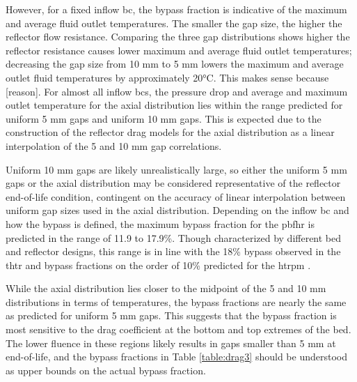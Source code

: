 However, for a fixed inflow \gls{bc}, the bypass fraction is indicative of the maximum and average fluid outlet temperatures. The smaller the gap size, the higher the reflector flow resistance. Comparing the three gap distributions shows higher the reflector resistance causes lower maximum and average fluid outlet temperatures; decreasing the gap size from 10 \si{\milli\meter} to 5 \si{\milli\meter} lowers the maximum and average outlet fluid temperatures by approximately 20\si{\celsius}. This makes sense because [reason]. For almost all inflow \glspl{bc}, the pressure drop and average and maximum outlet temperature for the axial distribution lies within the range predicted for uniform 5 \si{\milli\meter} gaps and uniform 10 \si{\milli\meter} gaps. This is expected due to the construction of the reflector drag models for the axial distribution as a linear interpolation of the 5 and 10 \si{\milli\meter} gap correlations. 

Uniform 10 \si{\milli\meter} gaps are likely unrealistically large, so either the uniform 5 \si{\milli\meter} gaps or the axial distribution may be considered representative of the reflector end-of-life condition, contingent on the accuracy of linear interpolation between uniform gap sizes used in the axial distribution. Depending on the inflow \gls{bc} and how the bypass is defined, the maximum bypass fraction for the \gls{pbfhr} is predicted in the range of 11.9 to 17.9\%. Though characterized by different bed and reflector designs, this range is in line with the 18\% bypass observed in the \gls{thtr} \cite{baumer} and bypass fractions on the order of 10\% predicted for the \gls{htrpm} \cite{jun,jun2011}.

While the axial distribution lies closer to the midpoint of the 5 and 10 \si{\milli\meter} distributions in terms of temperatures, the bypass fractions are nearly the same as predicted for uniform 5 \si{\milli\meter} gaps. This suggests that the bypass fraction is most sensitive to the drag coefficient at the bottom and top extremes of the bed. The lower fluence in these regions likely results in gaps smaller than 5 \si{\milli\meter} at end-of-life, and the bypass fractions in Table \ref{table:drag3} should be understood as upper bounds on the actual bypass fraction.

